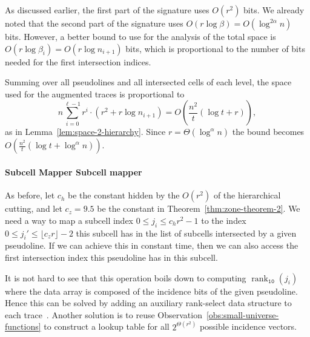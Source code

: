 As discussed earlier, the first part of the signature uses \(O(r^2)\) bits.
We already noted that the second part of the signature
uses \(O(r \log \beta) = O(\log^{2 \alpha} n)\) bits. However, a better bound
to use for the analysis of the total space is
\(O(r \log \beta_i) = O(r \log n_{i+1})\) bits, which is proportional to the
number of bits needed for the first intersection indices.

Summing over all pseudolines and all intersected cells of each level,
the space used for the augmented traces is proportional to
\begin{displaymath}
n \sum_{i=0}^{\ell-1} r^i \cdot \left( r^2 + r \log n_{i+1} \right)
=
O\left(\frac{n^2}{t} (\log t + r)\right),
\end{displaymath}
%
as in Lemma~\ref{lem:space-2-hierarchy}.
Since \(r = \Theta(\log^{\alpha} n)\) the bound becomes
\(O\left(\frac{n^2}{t} (\log t + \log^{\alpha} n)\right)\).


\paragraph*{\iftitlecase%
Subcell Mapper\else%
Subcell mapper\fi}

As before, let \(c_h\) be the constant hidden by the \(O(r^2)\) of the
hierarchical cutting, and let \(c_z = 9.5\) be the constant in
Theorem~\ref{thm:zone-theorem-2}.
We need a way to map a subcell index \(0 \leq j_i \leq c_h r^2 - 1\) to the
index \(0 \leq j_i' \leq \lfloor c_z r \rfloor - 2\) this subcell has in the
list of subcells intersected by a given pseudoline. If we can achieve this in
constant time, then we can also access the first intersection index this
pseudoline has in this subcell.

It is not hard to see that this operation boils down to computing
\(\operatorname{rank}_{\texttt{10}}(j_i)\) where the data array is composed of
the incidence bits of the given pseudoline. Hence this can be solved by adding
an auxiliary rank-select data structure to each trace~\cite{RRS07,BH17}.
Another solution is to reuse Observation~\ref{obs:small-universe-functions} to
construct a lookup table for all \(2^{\Theta(r^2)}\) possible incidence
vectors.
%

